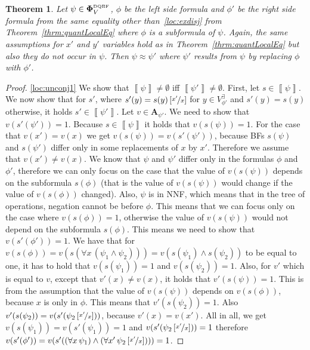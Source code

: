 \documentclass[
  digital, %
  color,
  twoside, %
  table,   %
  nolof,     %
  nolot,     %
]{fithesis3}
\newtheorem{theorem}{Theorem}[chapter] %
\theoremstyle{definition}
\theoremstyle{remark}
\newcommand{\seman}[1]{\left\llbracket {#1} \right\rrbracket}
\newcommand{\substitute}[2]{\left[ \nicefrac{#2}{#1} \right]}
\newcommand{\DQBF}[1]{\mathbf{\Phi}_{#1}^{\normalfont{\text{\tiny DQBF}}}}
\newcommand{\valtns}[1]{\mathbf{A}_{#1}}
\newcommand{\evars}[1]{V_{#1}^{\exists}}
\newcommand{\itholds}{\,}
\begin{document}
\begin{theorem}
  \label{thrm:quantLocalSubformulas}
  Let $\psi \in \DQBF{V}$, $\phi$ be the left side formula and $\phi'$ be the right side formula  from the same equality other than~\eqref{loc:exdisj} from Theorem~\ref{thrm:quantLocalEq} where $\phi$ is a subformula of $\psi$. Again, the same assumptions for $x'$ and $y'$ variables hold as in Theorem~\ref{thrm:quantLocalEq} but also they do not occur in $\psi$. Then $\psi \approx \psi'$ where $\psi'$ results from $\psi$ by replacing $\phi$ with $\phi'$.
\end{theorem}
\begin{proof}
  \eqref{loc:unconj1} We show that $\seman{\psi} \not= \emptyset$ iff $\seman{\psi'} \not= \emptyset$. First, let $s \in \seman{\psi}$. We now show that for $s'$, where $s'(y) = s(y)\substitute{x}{x'}$ for $y \in \evars{\phi'}$ and $s'(y) = s(y)$ otherwise, it holds $s' \in \seman{\psi'}$. Let $v \in \valtns{\psi'}$. We need to show that $v(s'(\psi')) = 1$. Because $s \in \seman{\psi}$ it holds that $v(s(\psi)) = 1$. For the case that $v(x') = v(x)$ we get $v(s(\psi)) = v(s'(\psi'))$, because BFs $s(\psi)$ and $s(\psi')$ differ only in some replacements of $x$ by $x'$. Therefore we assume that $v(x') \not= v(x)$. We know that $\psi$ and $\psi'$ differ only in the formulas $\phi$ and $\phi'$, therefore we can only focus on the case that the value of $v(s(\psi))$ depends on the subformula $s(\phi)$ (that is the value of $v(s(\psi))$ would change if the value of $v(s(\phi))$ changed). Also, $\psi$ is in NNF, which means that in the tree of operations, negation cannot be before $\phi$. This means that we can focus only on the case where $v(s(\phi)) = 1$, otherwise the value of $v(s(\psi))$ would not depend on the subformula $s(\phi)$. This means we need to show that $v(s'(\phi')) = 1$. We have that for $v(s(\phi)) = v(s(\forall x \itholds (\psi_1 \land \psi_2))) = v(s(\psi_1) \land s(\psi_2))$ to be equal to one, it has to hold that $v(s(\psi_1)) = 1$ and $v(s(\psi_2)) = 1$. Also, for $v'$ which is equal to $v$, except that $v'(x) \not= v(x)$, it holds that $v'(s(\psi)) = 1$. This is from the assumption that the value of $v(s(\psi))$ depends on $v(s(\phi))$, because $x$ is only in $\phi$. This means that $v'(s(\psi_2)) = 1$. Also $v'(s(\psi_2)) = v(s'(\psi_2\substitute{x}{x'}))$, because $v'(x) = v(x')$. All in all, we get $v(s(\psi_1)) = v(s'(\psi_1)) = 1$ and $v(s'(\psi_2\substitute{x}{x'})) = 1$ therefore $v(s'(\phi')) = v(s'((\forall x \itholds \psi_1) \land (\forall x' \itholds \psi_2\substitute{x}{x'}))) = 1$.
  

\end{proof}
\end{document}
